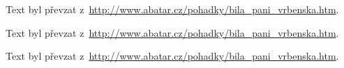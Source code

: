 \documentclass{article}
\begin{document}
  \noindent Text byl převzat
  z~\url{http://www.abatar.cz/pohadky/bila_pani_vrbenska.htm}.

  \noindent Text byl převzat
  z~\url{http://www.abatar.cz/pohadky/bila_pani_vrbenska.htm}.
  
  \noindent Text byl převzat
  z~\url{http://www.abatar.cz/pohadky/bila_pani_vrbenska.htm}.
\end{document}
